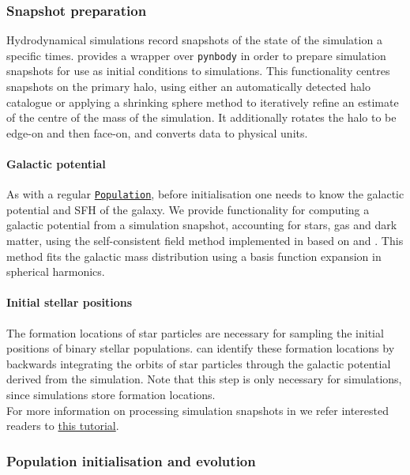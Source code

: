 \documentclass[twocolumn, twocolappendix, oneside, linenumbers]{aastex631}
\newcommand{\codeLink}[2]{{\href{https://cogsworth.readthedocs.io/en/latest/api/cogsworth.#2.#1.html}{\color{codecolour} \texttt{#1}}}}
\newcommand{\tutorialLink}[2]{\href{#1}{{\color{codecolour}#2}}}
\begin{document}
\subsubsection{Snapshot preparation}\label{sec:prep_snapshots}

Hydrodynamical simulations record snapshots of the state of the simulation a specific times. \cogsworth provides a wrapper over \texttt{pynbody} \citep{pynbody} in order to prepare simulation snapshots for use as initial conditions to simulations. This functionality centres snapshots on the primary halo, using either an automatically detected halo catalogue or applying a shrinking sphere method to iteratively refine an estimate of the centre of the mass of the simulation. It additionally rotates the halo to be edge-on and then face-on, and converts data to physical units. 

\paragraph{Galactic potential} As with a regular \codeLink{Population}{pop}, before initialisation one needs to know the galactic potential and SFH of the galaxy. We provide functionality for computing a galactic potential from a simulation snapshot, accounting for stars, gas and dark matter, using the self-consistent field method implemented in \gala based on \citet{Hernquist+1992:1992ApJ...386..375H} and \citet{Lowing+2011:2011MNRAS.416.2697L}. This method fits the galactic mass distribution using a basis function expansion in spherical harmonics.

\paragraph{Initial stellar positions} The formation locations of star particles are necessary for sampling the initial positions of binary stellar populations. \cogsworth can identify these formation locations by backwards integrating the orbits of star particles through the galactic potential derived from the simulation. Note that this step is only necessary for \fire simulations, since \changa simulations store formation locations.\\

\noindent For more information on processing simulation snapshots in \cogsworth we refer interested readers to \tutorialLink{https://cogsworth.readthedocs.io/en/latest/tutorials/hydro/prep.html}{this tutorial}.

\subsubsection{Population initialisation and evolution}
\end{document}
